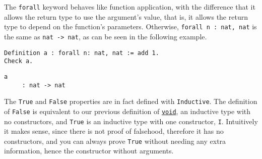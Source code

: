 The \texttt{forall} keyword behaves like function application, with the difference that it
allows the return type to use the argument's value, that is, it allows the return type to depend on
the  function's parameters. Otherwise, \texttt{forall n : nat, nat} is the same as
\texttt{nat -> nat}, as can be seen in the following example.

\begin{verbatim}
Definition a : forall n: nat, nat := add 1.
Check a.
\end{verbatim}
\vspace{-\baselineskip*3/2}
\begin{verbatim}
a
     : nat -> nat
\end{verbatim}

The \texttt{True} and \texttt{False} properties are in fact defined with \texttt{Inductive}. The definition of \texttt{False} is equivalent to our previous definition of 
\hyperref[lst:void]{\texttt{void}}, an inductive type with no constructors, and 
\texttt{True} is an inductive type with one constructor, \texttt{I}. Intuitively it 
makes sense, since there is not proof of falsehood, therefore it has no constructors, and you can always
prove \texttt{True} without needing any extra information, hence the constructor without 
arguments.

